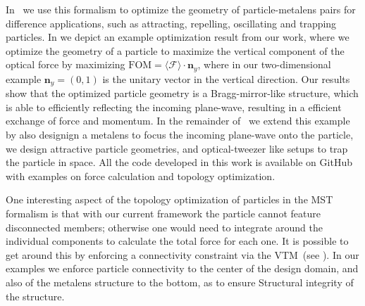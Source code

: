 In~\cite{ownpub3} we use this formalism to optimize the geometry of particle-metalens pairs for difference applications, such as attracting, repelling, 
oscillating and trapping particles. In  we depict an example optimization result from our work, where 
we optimize the geometry of a particle to maximize the vertical component of the optical force by maximizing $\text{FOM} = \langle\bm{\mathcal{F}}\rangle \cdot \mathbf{n}_y$, where
in our two-dimensional example $\mathbf{n}_y = (0, 1)$ is the unitary vector in the vertical direction.  Our results show that the optimized particle geometry is a Bragg-mirror-like
structure, which is able to efficiently reflecting the incoming plane-wave, resulting in a efficient exchange of force and momentum. In the remainder of~\cite{ownpub3} we extend this example by also designign a metalens to focus the incoming plane-wave onto the particle,
we design attractive particle geometries, and optical-tweezer like setups to trap the particle in space. All the code developed in this work is available on GitHub~\cite{github_MST} with examples on force calculation and topology optimization. 

One interesting aspect of the topology optimization of particles in the MST formalism is that with our current framework the particle cannot feature disconnected members; otherwise
one would need to integrate around the individual components to calculate the total force for each one. It is possible to get around this by enforcing 
a connectivity constraint via the VTM~\cite{li_structural_2016}(see ). In our examples
we enforce particle connectivity to the center of the design domain, and also of the metalens structure to the bottom, as to ensure Structural
integrity of the structure.


